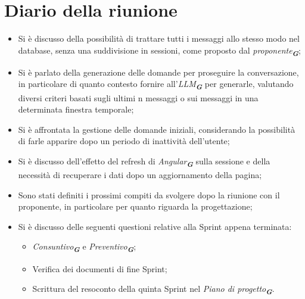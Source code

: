 
\section{Diario della riunione}

\begin{itemize}
    \item Si è discusso della possibilità di trattare tutti i messaggi allo stesso modo nel database, senza una suddivisione in
    sessioni, come proposto dal \emph{proponente}\textsubscript{\textbf{\textit{G}}};
    \item Si è parlato della generazione delle domande per proseguire la conversazione, in particolare di quanto contesto fornire
    all'\emph{LLM}\textsubscript{\textbf{\textit{G}}} per generarle, valutando diversi criteri basati sugli ultimi n messaggi o sui 
    messaggi in una determinata finestra temporale;
    \item Si è affrontata la gestione delle domande iniziali, considerando la possibilità di farle apparire dopo un periodo di inattività
    dell'utente;
    \item Si è discusso dell’effetto del refresh di \emph{Angular}\textsubscript{\textbf{\textit{G}}} sulla sessione e della necessità
    di recuperare i dati dopo un aggiornamento della pagina;
    \item Sono stati definiti i prossimi compiti da svolgere dopo la riunione con il proponente, in particolare per quanto riguarda
    la progettazione;
    \item Si è discusso delle seguenti questioni relative alla Sprint appena terminata:
        \begin{itemize}
            \item \emph{Consuntivo}\textsubscript{\textbf{\textit{G}}} e \emph{Preventivo}\textsubscript{\textbf{\textit{G}}};
            \item Verifica dei documenti di fine Sprint;
            \item Scrittura del resoconto della quinta Sprint nel \emph{Piano di progetto}\textsubscript{\textbf{\textit{G}}}.
        \end{itemize}
\end{itemize}

